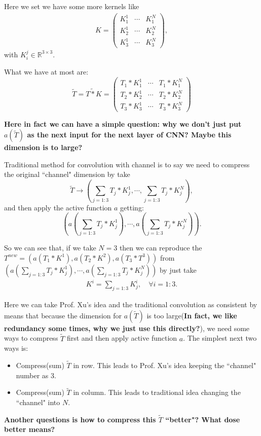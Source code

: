 Here we set we have some more kernels like 
\begin{align}
K = 
\begin{pmatrix}
K_1^1 & \cdots & K_1^N \\
K_2^1 & \cdots & K_2^N \\
K_3^1 & \cdots & K_3^N 
\end{pmatrix},
\end{align} with $K_i^j \in \mathbb{R}^{3\times3}$.

What we have at most are:
\begin{equation}
\tilde{T} = T\tilde{\ast} K =  \begin{pmatrix}
T_1 \ast K_1^1 & \cdots & T_1\ast K_1^N \\
T_2 \ast K_2^1 & \cdots & T_2\ast K_2^N \\
T_3 \ast K_3^1 & \cdots & T_3\ast K_3^N 
\end{pmatrix}
\end{equation}

{\bf Here in fact we can have a simple question: why we don't just put $a(\tilde{T})$ as the next input for the next layer of CNN? Maybe this dimension is to large?}

Traditional method for convolution with channel is to say we need to compress the original ``channel" dimension by take 
\begin{equation}
\tilde{T}  \to ( \sum_{j=1:3} T_j\ast K_{j}^1, \cdots, \sum_{j=1:3} T_j\ast K_{j}^N),
\end{equation} 
and then apply the active function $a$ getting:
\begin{equation}
(a( \sum_{j=1:3} T_j\ast K_{j}^1), \cdots, a(\sum_{j=1:3} T_j\ast K_{j}^N)).
\end{equation}

So we can see that, if we take $ N = 3$ then we can reproduce the 
$T^{new} = (a(T_1 \ast K^1), a(T_2\ast K^2), a(T_3 \ast T^3))$ from $(a( \sum_{j=1:3} T_j\ast K_{j}^1), \cdots, a(\sum_{j=1:3} T_j\ast K_{j}^N))$ by just take
\begin{align}
K^i = \sum_{j=1:3} K_j^i, \quad \forall i = 1:3.
\end{align}

\begin{remark}
Here we can take Prof. Xu's idea and the traditional convolution as consistent by means that because the dimension for $a(\tilde{T})$ is too large({\bf In fact, we like redundancy some times, why we just use this directly?}), we need some ways to compress $\tilde{T}$ first and then apply active function $a$. The simplest next two ways is:
\begin{itemize}
\item Compress(sum) $\tilde{T}$ in row. This leads to Prof. Xu's idea keeping the ``channel" number as 3.
\item Compress(sum) $\tilde{T}$ in column. This leads to traditional idea changing the ``channel" into $N$.
\end{itemize}

{\bf Another questions is how to compress this $\tilde{T}$ ``better"?  What dose better means?}
 
\end{remark}
 
